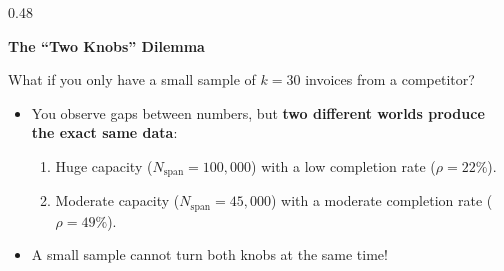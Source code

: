 \documentclass[aspectratio=169,10pt]{beamer}
\begin{document}
\begin{frame}[c]
\begin{columns}[t,onlytextwidth]
\begin{column}{0.48\textwidth}
{\begin{minipage}{\dimexpr\linewidth-2\fboxsep-2\fboxrule\relax}
          {\small \textbf{\color{accentred} The ``Two Knobs'' Dilemma}}\\[0.08cm]
          {\scriptsize
          What if you only have a small sample of $k = 30$ invoices from a competitor?
          \begin{itemize}
            \setlength{\itemsep}{0.08cm}
            \item You observe gaps between numbers, but \textbf{two different worlds produce the exact same data}:
            \begin{enumerate}
              \setlength{\itemsep}{0.03cm}
              \item Huge capacity ($N_{\mathrm{span}} = 100{,}000$) with a low completion rate ($\rho = 22\%$).
              \item Moderate capacity ($N_{\mathrm{span}} = 45{,}000$) with a moderate completion rate ($\rho = 49\%$).
            \end{enumerate}
            \item A small sample cannot turn both knobs at the same time!
          \end{itemize}}
          \vspace{0.08cm}
        \end{minipage}
      }
    \end{column}
  \end{columns}
  
  \vspace{0.22cm}
  \begin{center}
    \setlength{\fboxrule}{1pt}
  \end{center}
\end{frame}
\end{document}

